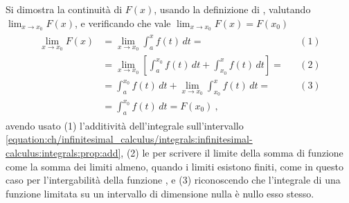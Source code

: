 \documentclass[letterpaper,10pt,italian]{jupyterBook}
\begin{document}
\sphinxAtStartPar
{} Si dimostra la continuità di \(F(x)\), usando la definizione di {\hyperref[\detokenize{ch/infinitesimal_calculus/analysis:infinitesimal-calculus-continuous-fun-def}]{}}, valutando \(\lim_{x \rightarrow x_0} F(x)\), e verificando che vale \(\lim_{x \rightarrow x_0} F(x) = F(x_0)\)
\begin{equation*}
\begin{split}\begin{aligned}
  \lim_{x \rightarrow x_0} F(x) 
  & = \lim_{x \rightarrow x_0} \int_{a}^{x} f(t) \, dt = && (1) \\
  & = \lim_{x \rightarrow x_0} \left[ \int_{a}^{x_0} f(t) \, dt + \int_{x_0}^{x} f(t) \, dt \right] = && (2) \\
  & = \int_{a}^{x_0} f(t) \, dt + \lim_{x \rightarrow x_0} \int_{x_0}^{x} f(t) \, dt = && (3) \\
  & = \int_{a}^{x_0} f(t) \, dt = F(x_0) \ ,
\end{aligned}\end{split}
\end{equation*}
\sphinxAtStartPar
avendo usato (1) l’additività dell’integrale sull’intervallo \eqref{equation:ch/infinitesimal_calculus/integrals:infinitesimal-calculus:integrals:prop:add}, (2) le {\hyperref[\detokenize{ch/infinitesimal_calculus/analysis:infinitesimal-calculus-limits-thms-operations}]{}} per scrivere il limite della somma di funzione come la somma dei limiti \sphinxhyphen{} almeno, quando i limiti esistono finiti, come in questo caso per l’intergabilità della funzione \sphinxhyphen{}, e (3) riconoscendo che l’integrale di una funzione limitata su un intervallo di dimensione nulla è nullo esso stesso.
\end{document}
